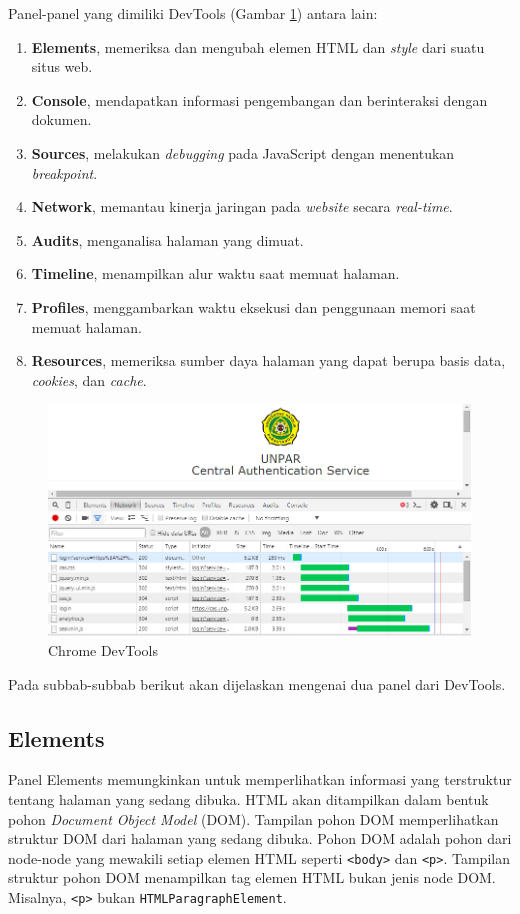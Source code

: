 Panel-panel yang dimiliki DevTools (Gambar \ref{fig:2_chrome_devtools}) antara lain:
\begin{enumerate}
	\item \textbf{Elements}, memeriksa dan mengubah elemen HTML dan \textit{style} dari suatu situs web.
	\item \textbf{Console}, mendapatkan informasi pengembangan dan berinteraksi dengan dokumen.
	\item \textbf{Sources}, melakukan \textit{debugging} pada JavaScript dengan menentukan \textit{breakpoint}.
	\item \textbf{Network}, memantau kinerja jaringan pada \textit{website} secara \textit{real-time}.
	\item \textbf{Audits}, menganalisa halaman yang dimuat.
	\item \textbf{Timeline}, menampilkan alur waktu saat memuat halaman.
	\item \textbf{Profiles}, menggambarkan waktu eksekusi dan penggunaan memori saat memuat halaman.
	\item \textbf{Resources}, memeriksa sumber daya halaman yang dapat berupa basis data, \textit{cookies}, dan \textit{cache}.
\end{enumerate}

\begin{figure}[H]
	\centering
	\includegraphics[scale=0.5]{Gambar/chrome-devtools}
	\caption{Chrome DevTools} 
	\label{fig:2_chrome_devtools}
\end{figure}

Pada subbab-subbab berikut akan dijelaskan mengenai dua panel dari DevTools.

\subsection{Elements}
Panel Elements memungkinkan untuk memperlihatkan informasi yang terstruktur tentang halaman yang sedang dibuka. HTML akan ditampilkan dalam bentuk pohon \textit{Document Object Model} (DOM). Tampilan pohon DOM memperlihatkan struktur DOM dari halaman yang sedang dibuka. Pohon DOM adalah pohon dari node-node yang mewakili setiap elemen HTML seperti \texttt{<body>} dan \texttt{<p>}. Tampilan struktur pohon DOM menampilkan tag elemen HTML bukan jenis node DOM. Misalnya, \texttt{<p>} bukan \texttt{HTMLParagraphElement}. 

